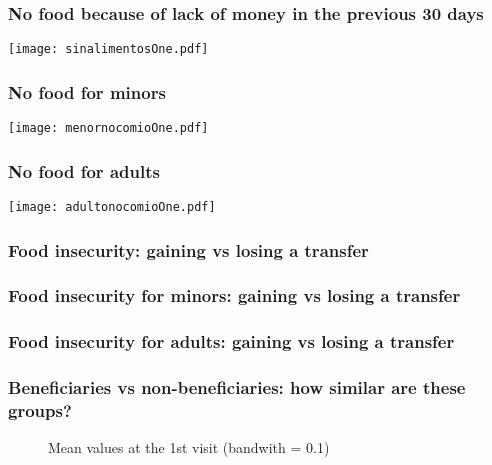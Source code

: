 \documentclass{beamer}
\begin{document}
\begin{frame}
\frametitle{No food because of lack of money in the previous 30 days}
\begin{center}
	\texttt{[image: sinalimentosOne.pdf]}
	\label{sinalimentosOne}
\end{center}
\end{frame}

\begin{frame}
\frametitle{No food for minors}
\begin{center}
\texttt{[image: menornocomioOne.pdf]}
\label{menornocomioOne}
\end{center}
\end{frame}

\begin{frame}
\frametitle{No food for adults}
\begin{center}
	\texttt{[image: adultonocomioOne.pdf]}
	\label{adultonocomioOne}
\end{center}
\end{frame}

\begin{frame}
\frametitle{Food insecurity: gaining vs losing a transfer}
\begin{figure}
	
\end{figure}
\end{frame}

\begin{frame}
\frametitle{Food insecurity for minors: gaining vs losing a transfer}
\begin{figure}

\end{figure}
\end{frame}

\begin{frame}
\frametitle{Food insecurity for adults: gaining vs losing a transfer}
\begin{figure}
	
\end{figure}
\end{frame}

\begin{frame}
\frametitle{Beneficiaries vs non-beneficiaries: how similar are these groups?}
\begin{figure}
	\caption{Mean values at the 1st visit (bandwith = 0.1)}
	
\end{figure}
\end{frame}
\end{document}

